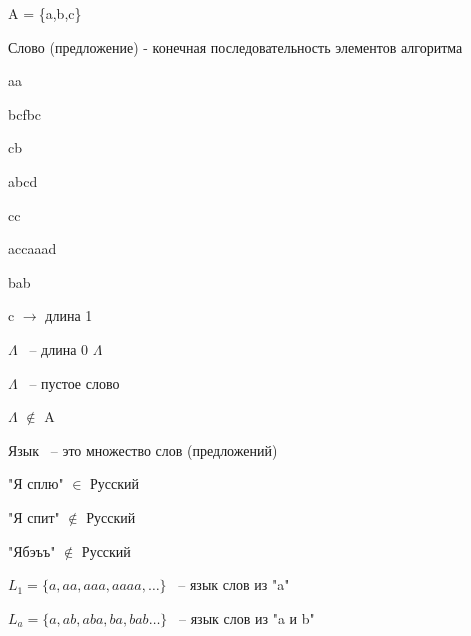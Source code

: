 \documentclass[russian]{lecture-notes}
\begin{document}
    \begin{example}

        A = \{a,b,c\}

        \end{example}

    \begin{definition}

        Слово (предложение) - конечная последовательность элементов алгоритма

        \end{definition}

    \begin{example}

        aa


        bcfbc

        cb

        abcd

        cc

        accaaad

        bab

        c $\rightarrow$ длина 1

       $ \Lambda$ ~-- длина 0 $\Lambda$

        $\Lambda$ ~-- пустое слово




        $\Lambda$ $\notin$ A
        \end{example}

    \begin{definition}

        Язык ~-- это множество слов (предложений)

        \end{definition}

    "Я сплю" $\in$ Русский

    "Я спит" $\notin$ Русский

    "Ябэъъ" $\notin$ Русский

    \begin{example}

        $L_{1} = \{ a,aa,aaa,aaaa, \dots \}$ ~-- язык слов из "a"

        \end{example}

    \begin{example}

        $L_{a} = \{ a,ab,aba,ba,bab \dots \}$ ~-- язык слов из "a и b"

        \end{example}
\end{document}
